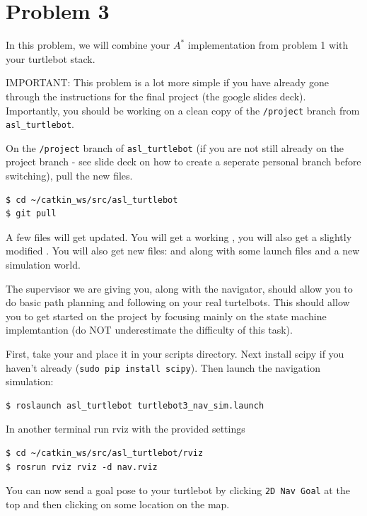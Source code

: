 \section*{Problem 3}

In this problem, we will combine your $A^*$ implementation from problem 1 with your turtlebot stack.

IMPORTANT: This problem is a lot more simple if you have already gone through the instructions for the final project (the google slides deck). Importantly, you should be working on a clean copy of the \verb|/project| branch from \verb|asl_turtlebot|.

On the \verb|/project| branch of \verb|asl_turtlebot| (if you are not still already on the project branch - see slide deck on how to create a seperate personal branch before switching), pull the new files.

\begin{lstlisting}
$ cd ~/catkin_ws/src/asl_turtlebot
$ git pull
\end{lstlisting}

A few files will get updated. You will get a working , you will also get a slightly modified . You will also get new files:  and  along with some launch files and a new simulation world.

The supervisor we are giving you, along with the navigator, should allow you to do basic path planning and following on your real turtelbots. This should allow you to get started on the project by focusing mainly on the state machine implemtantion (do NOT underestimate the difficulty of this task).

First, take your  and place it in your scripts directory. Next install scipy if you haven't already (\verb|sudo pip install scipy|). Then launch the navigation simulation:

\begin{lstlisting}
$ roslaunch asl_turtlebot turtlebot3_nav_sim.launch
\end{lstlisting}

In another terminal run rviz with the provided settings

\begin{lstlisting}
$ cd ~/catkin_ws/src/asl_turtlebot/rviz
$ rosrun rviz rviz -d nav.rviz
\end{lstlisting}

You can now send a goal pose to your turtlebot by clicking \verb|2D Nav Goal| at the top and then clicking on some location on the map.

